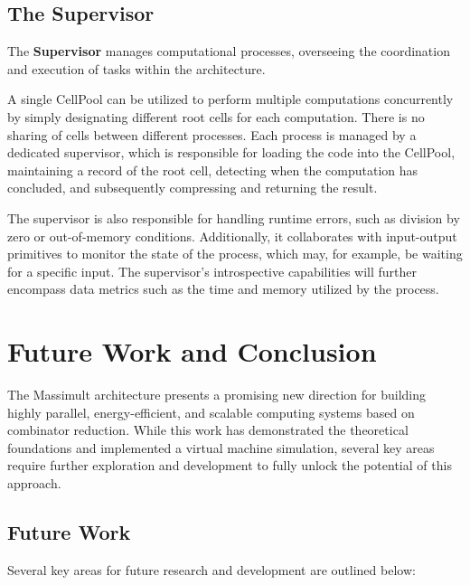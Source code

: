 \documentclass{IEEEtran}
\begin{document}
\subsection{The Supervisor}
The \textbf{Supervisor} manages computational processes, overseeing the coordination and execution of tasks within the architecture.

\par A single CellPool can be utilized to perform multiple computations concurrently by simply designating different root cells for each computation. There is no sharing of cells between different processes. Each process is managed by a dedicated supervisor, which is responsible for loading the code into the CellPool, maintaining a record of the root cell, detecting when the computation has concluded, and subsequently compressing and returning the result.

\par The supervisor is also responsible for handling runtime errors, such as division by zero or out-of-memory conditions. Additionally, it collaborates with input-output primitives to monitor the state of the process, which may, for example, be waiting for a specific input. The supervisor's introspective capabilities will further encompass data metrics such as the time and memory utilized by the process.
\section{Future Work and Conclusion}

\par The Massimult architecture presents a promising new direction for building highly parallel, energy-efficient, and scalable computing systems based on combinator reduction. While this work has demonstrated the theoretical foundations and implemented a virtual machine simulation, several key areas require further exploration and development to fully unlock the potential of this approach.

\subsection{Future Work}
Several key areas for future research and development are outlined below:
\end{document}

